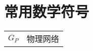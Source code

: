 \chapter*{常用数学符号}

\begin{table}[htbp]
	\centering
	\begin{tabular}{p{6.94em}l}
		$G_P$ & 物理网络 \\
	\end{tabular}%
\end{table}%

